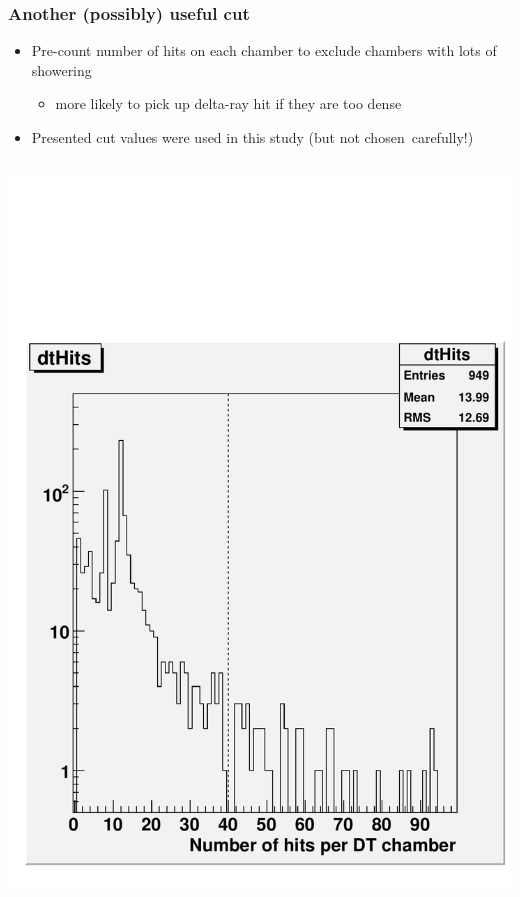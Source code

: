 \documentclass[compress]{beamer}
\begin{document}
\begin{frame}
\frametitle{Another (possibly) useful cut}

\begin{itemize}
\item Pre-count number of hits on each chamber to exclude chambers with lots of showering
\begin{itemize}
\item more likely to pick up delta-ray hit if they are too dense
\end{itemize}
\item Presented cut values were used in this study (but not \mbox{chosen carefully!)\hspace{-1 cm}}
\end{itemize}

\vfill
\begin{columns}
\includegraphics[width=\linewidth]{dtHits.pdf}

\end{columns}
\end{frame}
\end{document}
